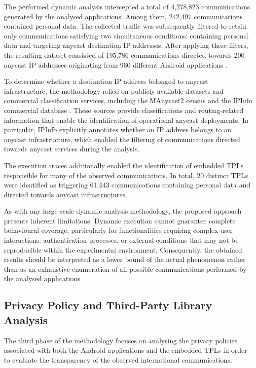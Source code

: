 The performed dynamic analysis intercepted a total of 4,278,823 communications generated by the analysed applications. Among them, 242,497 communications contained personal data. The collected traffic was subsequently filtered to retain only communications satisfying two simultaneous conditions: containing personal data and targeting anycast destination IP addresses. After applying these filters, the resulting dataset consisted of 195,786 communications directed towards 200 anycast IP addresses originating from 960 different Android applications \cite{Pascual2025AnycastDisaster}.

To determine whether a destination IP address belonged to anycast infrastructure, the methodology relied on publicly available datasets and commercial classification services, including the MAnycast2 census \cite{Sommese2020MAnycast2:Anycast} and the IPInfo commercial database \cite{IPIPinfo}. These sources provide classifications and routing-related information that enable the identification of operational anycast deployments. In particular, IPInfo explicitly annotates whether an IP address belongs to an anycast infrastructure, which enabled the filtering of communications directed towards anycast services during the analysis.

The execution traces additionally enabled the identification of embedded TPLs responsible for many of the observed communications. In total, 20 distinct TPLs were identified as triggering 61,443 communications containing personal data and directed towards anycast infrastructures.

As with any large-scale dynamic analysis methodology, the proposed approach presents inherent limitations. Dynamic execution cannot guarantee complete behavioural coverage, particularly for functionalities requiring complex user interactions, authentication processes, or external conditions that may not be reproducible within the experimental environment. Consequently, the obtained results should be interpreted as a lower bound of the actual phenomenon rather than as an exhaustive enumeration of all possible communications performed by the analysed applications.

\subsection{Privacy Policy and Third-Party Library Analysis}
\label{sc:anycast_experiments_privacy_policies}

The third phase of the methodology focuses on analysing the privacy policies associated with both the Android applications and the embedded TPLs in order to evaluate the transparency of the observed international communications.

